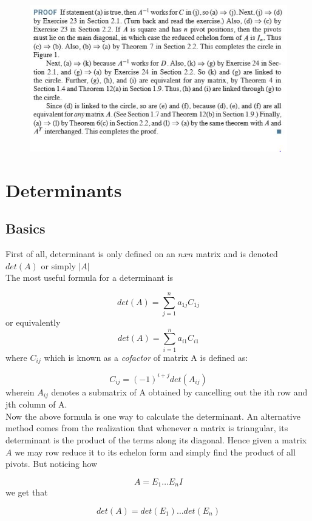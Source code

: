 \documentclass[titlepage]{article}
\numberwithin{equation}{subsection}
\begin{document}
\clearpage

\begin{figure}[H]
    \centering
    \includegraphics{epflLectureNotes/linearAlgebra/figures/proof.JPG}

\end{figure}

\section{Determinants}
\subsection{Basics}

First of all, determinant is only defined on an $nxn$ matrix and is denoted $det(A)$ or simply $|A|$
\\
The most useful formula for a determinant is 

$$ det(A) = \sum_{j=1}^{n} a_{1j}C_{1j}$$ or equivalently 
$$ det(A) = \sum_{i=1}^{n} a_{i1}C_{i1}$$
where $C_{ij}$ which is known as a \textit{cofactor} of matrix A is defined as:

$$ C_{ij} = (-1)^{i+j}det(A_{ij})$$ wherein $A_{ij}$ denotes a submatrix of A obtained by cancelling out the ith row and jth column of A. 
\\
Now the above formula is one way to calculate the determinant. An alternative method comes from the realization that whenever a matrix is triangular, its determinant is the product of the terms along its diagonal. Hence given a matrix $A$ we may row reduce it to its echelon form and simply find the product of all pivots. But noticing how 

$$ A = E_{1}\ldots E_{n}I$$ we get that

$$det(A) = det(E_{1})\ldots det(E_{n})$$
\end{document}
